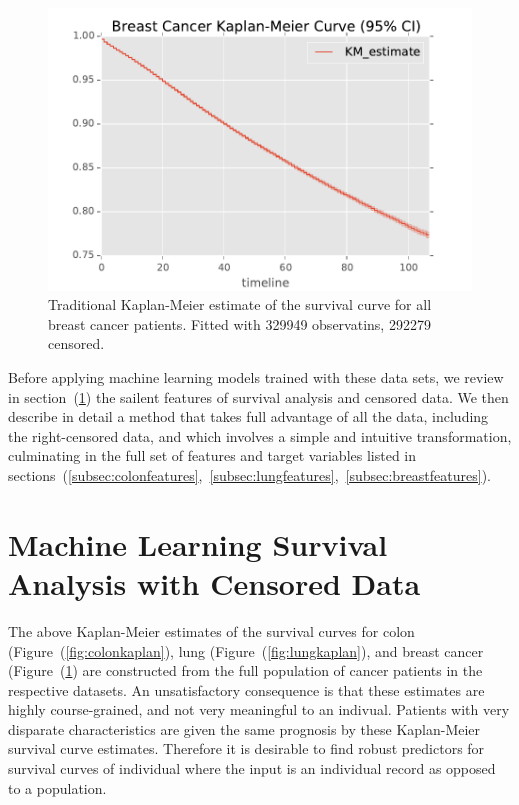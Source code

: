 \documentclass[a4paper,11pt]{article}
\begin{document}
\begin{figure}[tbp]
\centering 
\begin{center}
\includegraphics[width=.90\textwidth,origin=c]{breastkaplan.pdf}
\caption{\label{fig:breastkaplan} Traditional Kaplan-Meier estimate of the survival curve for all breast cancer patients. Fitted with 329949 observatins, 292279 censored.}
\end{center}
\end{figure}


Before applying machine learning models trained with these data sets, we review in section~(\ref{sec:surv}) the sailent features of survival analysis and censored data. We then describe in detail a method that takes full advantage of all the data, including the right-censored data, and which involves a simple and intuitive transformation, culminating in the full set of features and target variables listed in sections~(\ref{subsec:colonfeatures},~\ref{subsec:lungfeatures},~\ref{subsec:breastfeatures}).

\section{Machine Learning Survival Analysis with Censored Data}
\label{sec:surv}


The above Kaplan-Meier estimates of the survival curves for colon (Figure~(\ref{fig:colonkaplan}), lung 
(Figure~(\ref{fig:lungkaplan}), and breast cancer (Figure~(\ref{fig:breastkaplan}) are constructed from the full population of cancer patients in the respective datasets.
An unsatisfactory consequence is that these estimates are highly course-grained, and not very meaningful to an indivual. Patients with very disparate characteristics are given the same prognosis by these Kaplan-Meier survival curve estimates. Therefore it is desirable to find robust predictors for survival curves of individual where the input is an individual record as opposed to a population.
\end{document}
